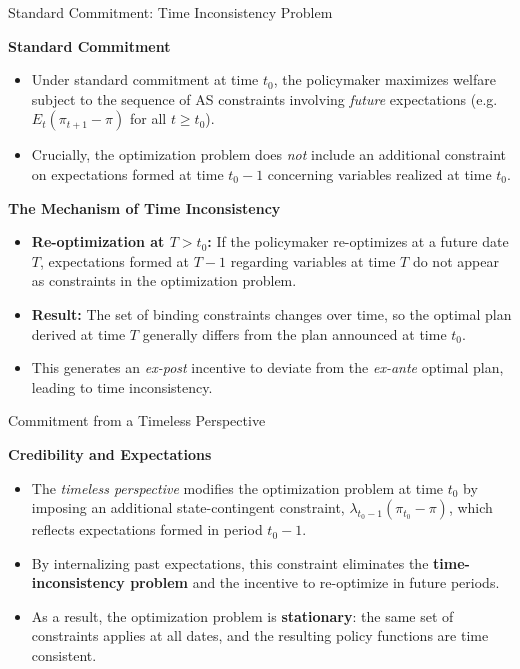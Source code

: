 \documentclass[11pt,aspectratio=169]{beamer}
\begin{document}
\begin{frame}{Standard Commitment: Time Inconsistency Problem}
\small

\textbf{Standard Commitment}
\begin{itemize}
  \item Under standard commitment at time $t_0$, the policymaker maximizes welfare subject to the sequence of AS constraints involving \emph{future} expectations (e.g.\ $E_{t}(\pi_{t+1}-\pi)$ for all $t \geq t_0$).
  \item Crucially, the optimization problem does \emph{not} include an additional constraint on expectations formed at time $t_0-1$ concerning variables realized at time $t_0$.
\end{itemize}

\vspace{0.2cm}

\textbf{The Mechanism of Time Inconsistency}
\begin{itemize}
  \item \textbf{Re-optimization at $T>t_0$:} If the policymaker re-optimizes at a future date $T$, expectations formed at $T-1$ regarding variables at time $T$ do not appear as constraints in the optimization problem.
  \item \textbf{Result:} The set of binding constraints changes over time, so the optimal plan derived at time $T$ generally differs from the plan announced at time $t_0$.
  \item This generates an \emph{ex-post} incentive to deviate from the \emph{ex-ante} optimal plan, leading to time inconsistency.
\end{itemize}

\end{frame}


\begin{frame}{Commitment from a Timeless Perspective}
\small

\textbf{Credibility and Expectations}
\begin{itemize}
  \item The \emph{timeless perspective} modifies the optimization problem at time $t_0$ by imposing an additional state-contingent constraint,
  $\lambda_{t_0-1}(\pi_{t_0}-\pi)$, which reflects expectations formed in period $t_0-1$.

  \item By internalizing past expectations, this constraint eliminates the \textbf{time-inconsistency problem} and the incentive to re-optimize in future periods.

  \item As a result, the optimization problem is \textbf{stationary}: the same set of constraints applies at all dates, and the resulting policy functions are time consistent.
\end{itemize}

\end{frame}
\end{document}
